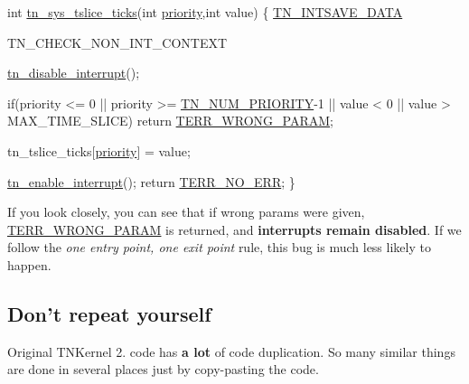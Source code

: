 \begin{DoxyCode}
\textcolor{keywordtype}{int} \hyperlink{tn__oldsymbols_8h_a74b0cfd9bbf5a85f4e0d00a984f60f5e}{tn\_sys\_tslice\_ticks}(\textcolor{keywordtype}{int} \hyperlink{structTN__Task_a43c9c73249da8faa1177587786c40616}{priority},\textcolor{keywordtype}{int} value)
\{
   \hyperlink{tn__arch__example_8h_a58899c98640384b8a2cf7f9ba6f53a23}{TN\_INTSAVE\_DATA}

   TN\_CHECK\_NON\_INT\_CONTEXT

   \hyperlink{tn__oldsymbols_8h_a27bf94f93625fa36125c3fa3ae6b4041}{tn\_disable\_interrupt}();

   \textcolor{keywordflow}{if}(priority <= 0 || priority >= \hyperlink{tn__oldsymbols_8h_a63b4da81df067abd19fe86f5712a34e3}{TN\_NUM\_PRIORITY}-1 ||
                                value < 0 || value > MAX\_TIME\_SLICE)
      \textcolor{keywordflow}{return} \hyperlink{tn__oldsymbols_8h_a35ec519d54f884d84c5814f49f00a22b}{TERR\_WRONG\_PARAM};

   tn\_tslice\_ticks[\hyperlink{structTN__Task_a43c9c73249da8faa1177587786c40616}{priority}] = value;

   \hyperlink{tn__oldsymbols_8h_acc85567ca09ede9cf2d58717506def46}{tn\_enable\_interrupt}();
   \textcolor{keywordflow}{return} \hyperlink{tn__oldsymbols_8h_a71970f860643e62fad7ec03076bdc1d8}{TERR\_NO\_ERR};
\}
\end{DoxyCode}


If you look closely, you can see that if wrong params were given, {\ttfamily \hyperlink{tn__oldsymbols_8h_a35ec519d54f884d84c5814f49f00a22b}{T\+E\+R\+R\+\_\+\+W\+R\+O\+N\+G\+\_\+\+P\+A\+R\+A\+M}} is returned, and {\bfseries interrupts remain disabled}. If we follow the {\itshape one entry point, one exit point} rule, this bug is much less likely to happen.\hypertarget{why_reimplement_why_reimplement__dont_repeat_yourself}{}\subsection{Don't repeat yourself}\label{why_reimplement_why_reimplement__dont_repeat_yourself}
Original T\+N\+Kernel 2. code has {\bfseries a lot} of code duplication. So many similar things are done in several places just by copy-\/pasting the code.


